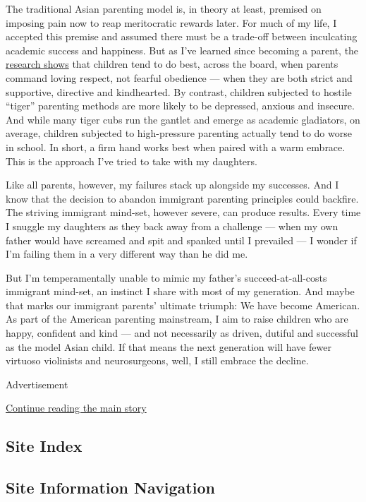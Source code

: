 The traditional Asian parenting model is, in theory at least, premised
on imposing pain now to reap meritocratic rewards later. For much of my
life, I accepted this premise and assumed there must be a trade-off
between inculcating academic success and happiness. But as I've learned
since becoming a parent, the
\href{https://www.ncbi.nlm.nih.gov/pmc/articles/PMC3641860/}{research
shows} that children tend to do best, across the board, when parents
command loving respect, not fearful obedience --- when they are both
strict and supportive, directive and kindhearted. By contrast, children
subjected to hostile ``tiger'' parenting methods are more likely to be
depressed, anxious and insecure. And while many tiger cubs run the
gantlet and emerge as academic gladiators, on average, children
subjected to high-pressure parenting actually tend to do worse in
school. In short, a firm hand works best when paired with a warm
embrace. This is the approach I've tried to take with my daughters.

Like all parents, however, my failures stack up alongside my successes.
And I know that the decision to abandon immigrant parenting principles
could backfire. The striving immigrant mind-set, however severe, can
produce results. Every time I snuggle my daughters as they back away
from a challenge --- when my own father would have screamed and spit and
spanked until I prevailed --- I wonder if I'm failing them in a very
different way than he did me.

But I'm temperamentally unable to mimic my father's succeed-at-all-costs
immigrant mind-set, an instinct I share with most of my generation. And
maybe that marks our immigrant parents' ultimate triumph: We have become
American. As part of the American parenting mainstream, I aim to raise
children who are happy, confident and kind --- and not necessarily as
driven, dutiful and successful as the model Asian child. If that means
the next generation will have fewer virtuoso violinists and
neurosurgeons, well, I still embrace the decline.

Advertisement

\protect\hyperlink{after-bottom}{Continue reading the main story}

\hypertarget{site-index}{%
\subsection{Site Index}\label{site-index}}

\hypertarget{site-information-navigation}{%
\subsection{Site Information
Navigation}\label{site-information-navigation}}

